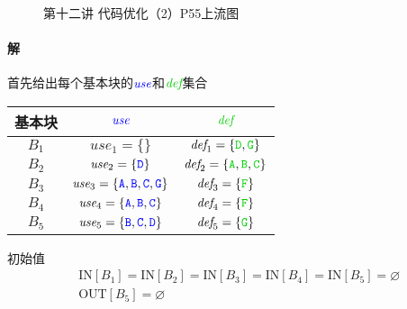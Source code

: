 \documentclass{article}
\begin{document}
\begin{figure}[H]
    \caption{第十二讲 代码优化（2）P55上流图}
\end{figure}

\paragraph{解}
首先给出每个基本块的$\textit{\color{blue}use}$和$\textit{\color{green!80!black}def}$集合
\begin{table}[H]
    \centering
    \begin{tabular}{|c|c|c|}
    \hline
    基本块 & $\textit{\color{blue}use}$ & $\textit{\color{green!80!black}def}$ \\ \hline
    $B_1$ & $\textit{use}_1 = \{\}$ & $\textit{def}_1 = \{\texttt{\color{green!80!black}D},\texttt{\color{green!80!black}G}\}$ \\ \hline
    $B_2$ & $\textit{use}_2 = \{\texttt{\color{blue}D}\}$ & $\textit{def}_2 = \{\texttt{\color{green!80!black}A},\texttt{\color{green!80!black}B},\texttt{\color{green!80!black}C}\}$ \\ \hline
    $B_3$ & $\textit{use}_3 = \{\texttt{\color{blue}A},\texttt{\color{blue}B},\texttt{\color{blue}C},\texttt{\color{blue}G}\}$ & $\textit{def}_3 = \{\texttt{\color{green!80!black}F}\}$ \\ \hline
    $B_4$ & $\textit{use}_4 = \{\texttt{\color{blue}A},\texttt{\color{blue}B},\texttt{\color{blue}C}\}$ & $\textit{def}_4 = \{\texttt{\color{green!80!black}F}\}$ \\ \hline
    $B_5$ & $\textit{use}_5 = \{\texttt{\color{blue}B},\texttt{\color{blue}C},\texttt{\color{blue}D}\}$ & $\textit{def}_5 = \{\texttt{\color{green!80!black}G}\}$ \\ \hline
    \end{tabular}
\end{table}
初始值
\begin{align*}
   & \text{IN}[B_1] = \text{IN}[B_2] = \text{IN}[B_3] = \text{IN}[B_4] = \text{IN}[B_5] = \varnothing \\
   & \text{OUT}[B_5] = \varnothing
\end{align*}
\end{document}
